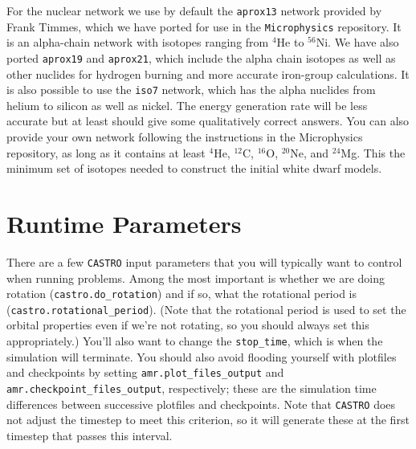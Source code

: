 \documentclass[12pt]{book}
\begin{document}
For the nuclear network we use by default the \texttt{aprox13} network provided by Frank Timmes, which 
we have ported for use in the \texttt{Microphysics} repository. It is an alpha-chain network 
with isotopes ranging from ${}^4$He to ${}^{56}$Ni. We have also ported \texttt{aprox19} and
\texttt{aprox21}, which include the alpha chain isotopes as well as other nuclides for hydrogen
burning and more accurate iron-group calculations. It is also possible to use the \texttt{iso7}
network, which has the alpha nuclides from helium to silicon as well as nickel. The energy generation
rate will be less accurate but at least should give some qualitatively correct answers. You can also
provide your own network following the instructions in the Microphysics repository, as long as it
contains at least ${}^4$He, ${}^{12}$C, ${}^{16}$O, ${}^{20}$Ne, and ${}^{24}$Mg. This the minimum
set of isotopes needed to construct the initial white dwarf models.

\section{Runtime Parameters}

There are a few \texttt{CASTRO} input parameters that you will typically want to control when running problems. 
Among the most important is whether we are doing rotation (\texttt{castro.do\_rotation}) and if so, 
what the rotational period is (\texttt{castro.rotational\_period}). (Note that the rotational period 
is used to set the orbital properties even if we're not rotating, so you should always set this appropriately.)
You'll also want to change the \texttt{stop\_time}, which is when the simulation will terminate. 
You should also avoid flooding yourself with plotfiles and checkpoints by setting \texttt{amr.plot\_files\_output} and 
\texttt{amr.checkpoint\_files\_output}, respectively; these are the simulation time differences
between successive plotfiles and checkpoints. Note that \texttt{CASTRO} does not adjust the timestep 
to meet this criterion, so it will generate these at the first timestep that passes this interval.
\end{document}
